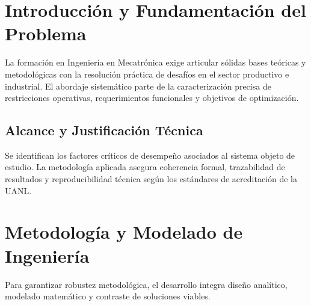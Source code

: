 \documentclass[
	spanish,
	letterpaper,
	oneside
]{article}
\begin{document}
\templatePortrait

\begin{abstract}
El presente informe documenta el desarrollo riguroso de la evidencia de aprendizaje correspondiente al programa educativo de Ingeniería en Mecatrónica en la Facultad de Ingeniería Mecánica y Eléctrica de la Universidad Autónoma de Nuevo León. Conforme a las directrices de calidad de AulaTeX, el trabajo aborda la formulación del problema técnico, el modelado y análisis riguroso de variables, la comprobación experimental o analítica y la transferencia directa al campo profesional, excluyendo cualquier residuo de metadatos operativos o plataformas de gestión.
\end{abstract}

\newpage


\section{Introducción y Fundamentación del Problema}
La formación en Ingeniería en Mecatrónica exige articular sólidas bases teóricas y metodológicas con la resolución práctica de desafíos en el sector productivo e industrial. El abordaje sistemático parte de la caracterización precisa de restricciones operativas, requerimientos funcionales y objetivos de optimización.

\subsection{Alcance y Justificación Técnica}
Se identifican los factores críticos de desempeño asociados al sistema objeto de estudio. La metodología aplicada asegura coherencia formal, trazabilidad de resultados y reproducibilidad técnica según los estándares de acreditación de la UANL.

\section{Metodología y Modelado de Ingeniería}
Para garantizar robustez metodológica, el desarrollo integra diseño analítico, modelado matemático y contraste de soluciones viables.
\end{document}
